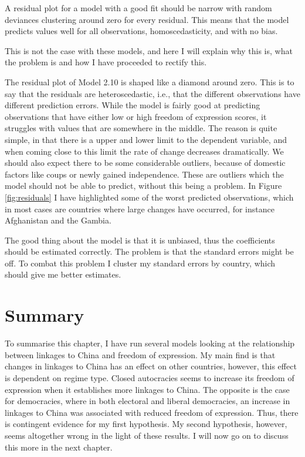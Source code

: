 A residual plot for a model with a good fit should be narrow with random deviances clustering around zero for every residual. This means that the model predicts values well for all observations, homoscedasticity,  and with no bias.

This is not the case with these models, and here I will explain why this is, what the problem is and how I have proceeded to rectify this.

The residual plot of Model 2.10 is shaped like a diamond around zero. This is to say that the residuals are heteroscedastic, i.e., that the different observations have different prediction errors. While the model is fairly good at predicting observations that have either low or high freedom of expression scores, it struggles with values that are somewhere in the middle. The reason is quite simple, in that there is a upper and lower limit to the dependent variable, and when coming close to this limit the rate of change decreases dramatically. We should also expect there to be some considerable outliers, because of domestic factors like coups or newly gained independence. These are outliers which the model should not be able to predict, without this being a problem. In Figure \ref{fig:residuals} I have highlighted some of the worst predicted observations, which in most cases are countries where large changes have occurred, for instance Afghanistan and the Gambia. 

The good thing about the model is that it is unbiased, thus the coefficients should be estimated correctly. The problem is that the standard errors might be off. To combat this problem I cluster my standard errors by country, which should give me better estimates.

\section{Summary}
To summarise this chapter, I have run several models looking at the relationship between linkages to China and freedom of expression. My main find is that changes in linkages to China has an effect on other countries, however, this effect is dependent on regime type. Closed autocracies seems to increase its freedom of expression when it establishes more linkages to China. The opposite is the case for democracies, where in both electoral and liberal democracies, an increase in linkages to China was associated with reduced freedom of expression. Thus, there is contingent evidence for my first hypothesis. My second hypothesis, however, seems altogether wrong in the light of these results. I will now go on to discuss this more in the next chapter.
